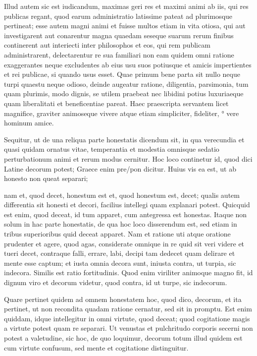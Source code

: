  Illud autem sic est iudicandum, maximas geri res et maximi animi ab iis, qui res publicas regant, quod earum administratio latissime pateat ad plurimosque pertineat; esse autem magni animi et fuisse multos etiam in vita otiosa, qui aut investigarent aut conarentur magna quaedam seseque suarum rerum finibus continerent aut interiecti inter philosophos et eos, qui rem publicam administrarent, delectarentur re sua familiari non eam quidem omni ratione exaggerantes neque excludentes ab eius usu suos potiusque et amicis impertientes et rei publicae, si quando usus esset. Quae primum bene parta sit nullo neque turpi quaestu neque odioso, deinde augeatur ratione, diligentia, parsimonia, tum quam plurimis, modo dignis, se utilem praebeat nec libidini potius luxuriaeque quam liberalitati et beneficentiae pareat. Haec praescripta servantem licet magnifice, graviter animoseque vivere atque etiam simpliciter, fideliter, ° vere hominum amice.

 Sequitur, ut de una reliqua parte honestatis dicendum sit, in qua verecundia et quasi quidam ornatus vitae, temperantia et modestia omnisque sedatio perturbationum animi et rerum modus cernitur. Hoc loco continetur id, quod dici Latine decorum potest; Graece enim pre/pon dicitur. Huius vis ea est, ut ab honesto non queat separari;

 nam et, quod decet, honestum est et, quod honestum est, decet; qualis autem differentia sit honesti et decori, facilius intellegi quam explanari potest. Quicquid est enim, quod deceat, id tum apparet, cum antegressa est honestas. Itaque non solum in hac parte honestatis, de qua hoc loco disserendum est, sed etiam in tribus superioribus quid deceat apparet. Nam et ratione uti atque oratione prudenter et agere, quod agas, considerate omnique in re quid sit veri videre et tueri decet, contraque falli, errare, labi, decipi tam dedecet quam delirare et mente esse captum; et iusta omnia decora sunt, iniusta contra, ut turpia, sic indecora. Similis est ratio fortitudinis. Quod enim viriliter animoque magno fit, id dignum viro et decorum videtur, quod contra, id ut turpe, sic indecorum.

 Quare pertinet quidem ad omnem honestatem hoc, quod dico, decorum, et ita pertinet, ut non recondita quadam ratione cernatur, sed sit in promptu. Est enim quiddam, idque intellegitur in omni virtute, quod deceat; quod cogitatione magis a virtute potest quam re separari. Ut venustas et pulchritudo corporis secerni non potest a valetudine, sic hoc, de quo loquimur, decorum totum illud quidem est cum virtute confusum, sed mente et cogitatione distinguitur.

